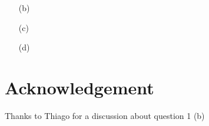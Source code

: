 \documentclass[10pt, a4paper]{article}
\begin{document}
{\begin{enumerate}
  \begin{align*}
    \left.\frac{\partial }{\partial x^{l}} O_{\Delta'}(x)\right|_{x = \lambda x_2} = \left.\frac{\partial \lambda x}{\partial x^{l}}  \frac{\partial }{\partial y^{l}} O_{\Delta'}\left(\lambda y\right)\right|_{y = x/\lambda, y = x_2} = \left.\lambda^{|l|} \lambda^{-\Delta'} \frac{\partial }{\partial y^{l}} O_{\Delta'}\left(y\right)\right|_{y = x_2} = \lambda^{|l|} \lambda^{-\Delta'} \frac{\partial }{\partial y^{l}} \partial_{l} O_{\Delta'}(x_2). 
  \end{align*}
  We can also extract constraints using the rotational invariance of the product. Supposing the operators in the product are scalar primaries, we can write $\mathcal{O}_{\Delta_1}\left(x_1\right)\mathcal{O}_{\Delta_2}\left(x_2\right) = \mathcal{O}_{\Delta_1}\left(R(x_1)\right)\mathcal{O}_{\Delta_2}\left(R(x_2)\right)$ where $R$ is a rotation in $\mathbb{R}^D$. Substituting this relation in the expansion yields 
  \begin{align*}
    f
  \end{align*} 
  \item[(b)] 
  \item[(c)]
  \item[(d)] 
\end{enumerate}


\section{Acknowledgement}

Thanks to Thiago for a discussion about question 1 (b)

}



\end{document}
